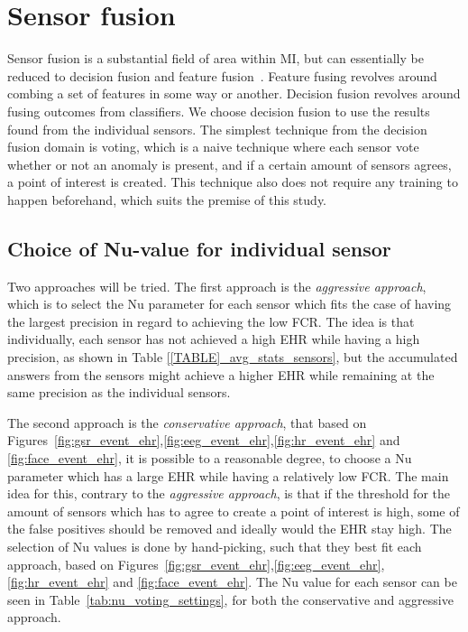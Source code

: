 \section{Sensor fusion}
Sensor fusion is a substantial field of area within MI, but can essentially be reduced to decision fusion and feature fusion~\cite{fusion_techniques}.
Feature fusing revolves around combing a set of features in some way or another.
Decision fusion revolves around fusing outcomes from classifiers.
We choose decision fusion to use the results found from the individual sensors.
The simplest technique from the decision fusion domain is voting, which is a naive technique where each sensor vote whether or not an anomaly is present, and if a certain amount of sensors agrees, a point of interest is created. This technique also does not require any training to happen beforehand, which suits the premise of this study.

\subsection{Choice of Nu-value for individual sensor}
Two approaches will be tried. The first approach is the \textit{aggressive approach}, which is to select the Nu
parameter for each sensor which fits the case of having the largest precision in regard to achieving the low FCR.
The idea is that individually, each sensor has not achieved a high EHR while having a high precision, as shown in Table
\ref{[TABLE]_avg_stats_sensors}, but the accumulated answers from the sensors might achieve a higher EHR while remaining
at the same precision as the individual sensors.

The second approach is the \textit{conservative approach}, that based on
Figures~\ref{fig:gsr_event_ehr},\ref{fig:eeg_event_ehr},\ref{fig:hr_event_ehr} and \ref{fig:face_event_ehr}, it is
possible to a reasonable degree, to choose a Nu parameter which has a large EHR while having a relatively low FCR. The
main idea for this, contrary to the \textit{aggressive approach}, is that if the threshold for the amount of sensors which has to agree to create a point of interest is high, some of the false positives should be removed and ideally would the EHR stay high.
The selection of Nu values is done by hand-picking, such that they best fit each approach, based on Figures~\ref{fig:gsr_event_ehr},\ref{fig:eeg_event_ehr},\ref{fig:hr_event_ehr} and \ref{fig:face_event_ehr}.
The Nu value for each sensor can be seen in Table~\ref{tab:nu_voting_settings}, for both the conservative and aggressive approach.

